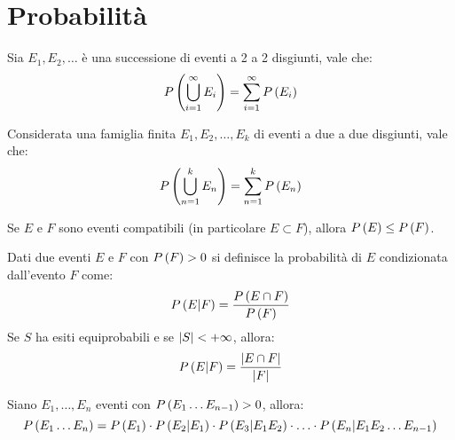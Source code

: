 

\makeatletter
\def\thm@space@setup{%
  \thm@preskip=1cm plus .2cm minus .5cm
  \thm@postskip=\thm@preskip %
}
\makeatother




\section{Probabilit\`a}

\begin{axiom}
Sia $E_1, E_2, \dots$ \`e una successione di eventi a 2 a 2 disgiunti, vale che:
\[
P \left( {\bigcup_{i=1}^{\infty} E_i} \right) = \sum_{i=1}^{\infty} P \left( {E_i} \right)
\]
\end{axiom}

\begin{prop}
Considerata una famiglia finita $E_1, E_2, \dots, E_k$ di eventi a due a due disgiunti, vale che:
\[
P \left( {\bigcup_{n=1}^{k} E_n} \right) = \sum_{n=1}^{k} P \left( {E_n} \right)
\]
\end{prop}

\begin{prop}
Se $E$ e $F$ sono eventi compatibili (in particolare $E \subset F$), allora $P \left( {E} \right) \le P \left( {F} \right)$.
\end{prop}

\begin{defn}
Dati due eventi $E$ e $F$ con $P \left( {F} \right) > 0$ si definisce la probabilit\`a di $E$ condizionata dall'evento $F$ come:
\[
P \left( E | F \right) = \frac{P \left( {E \cap F} \right)}{P \left( {F} \right)} 
\]
Se $S$ ha esiti equiprobabili e se $\left\lvert{S}\right\rvert < + \infty$, allora:
\[
P \left( E | F \right) = \frac{\left\lvert{E \cap F}\right\rvert}{\left\lvert{F}\right\rvert}
\]
\end{defn}

\begin{theorem}
Siano $E_1, \ldots, E_n$ eventi con $P \left( {E_1 \ldots E_{n-1}} \right) > 0$, allora:
\[
P \left( {E_1 \ldots E_{n}} \right) = P \left( {E_1} \right) \cdot P \left( E_2 | E_1 \right) \cdot P \left( E_3 | E_1 E_2 \right) \cdot \ldots \cdot P \left( E_n  | E_1 E_2 \ldots E_{n-1} \right)
\]
\end{theorem}

